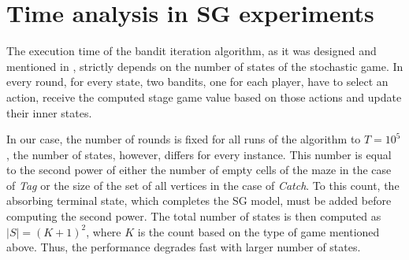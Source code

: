 \documentclass[../main.tex]{subfiles}
\begin{document}
\chapter{Time analysis in SG experiments}\label{apx:time}
The execution time of the bandit iteration algorithm, as it was designed and mentioned in , strictly depends on the number of states of the stochastic game.
In every round, for every state, two bandits, one for each player, have to select an action, receive the computed stage game value based on those actions and update their inner states.

In our case, the number of rounds is fixed for all runs of the algorithm to $T = 10^5$, the number of states, however, differs for every instance.
This number is equal to the second power of either the number of empty cells of the maze in the case of \textit{Tag} or the size of the set of all vertices in the case of \textit{Catch}.
To this count, the absorbing terminal state, which completes the SG model, must be added before computing the second power.
The total number of states is then computed as $|S| = (K + 1)^2$, where $K$ is the count based on the type of game mentioned above.
Thus, the performance degrades fast with larger number of states.
\end{document}
